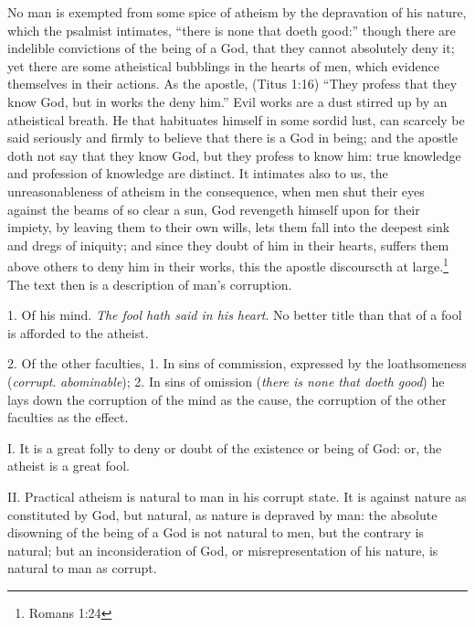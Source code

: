 \documentclass[a5paper]{book}
\begin{document}
No man is exempted from some spice of atheism by the depravation of his nature,
    which the psalmist intimates, 
    ``there is none that doeth good:''
    though there are indelible convictions of the being of a God,
    that they cannot absolutely deny it; 
    yet there are some atheistical bubblings in the hearts of men, 
    which evidence themselves in their actions. 
As the apostle, (Titus 1:16) ``They profess that they know God, 
    but in works the deny him.'' 
Evil works are a dust stirred up by an atheistical breath. 
He that habituates himself in some sordid lust, 
    can scarcely be said seriously and firmly to believe 
    that there is a God in being; 
    and the apostle doth not say that they know God, 
    but they profess to know him: 
    true knowledge and profession of knowledge are distinct.
It intimates also to us, 
    the unreasonableness of atheism in the consequence, 
    when men shut their eyes against the beams of so clear a sun,
    God revengeth himself upon for their impiety, 
    by leaving them to their own wills, 
    lets them fall into the deepest sink and dregs of iniquity; 
    and since they doubt of him in their hearts, 
    suffers them above others to deny him in their works, 
    this the apostle discourscth at large.\footnote{Romans 1:24}
The text then is a description of man’s corruption.

1. Of his mind. \emph{The fool hath said in his heart}. 
    No better title than that of a fool is afforded to the atheist.

2. Of the other faculties, 
    1. In sins of commission, expressed by the loathsomeness
    (\emph{corrupt}. \emph{abominable}); 
    2. In sins of omission (\emph{there is none that doeth good})
    he lays down the corruption of the mind as the cause,
    the corruption of the other faculties as the effect.

I. It is a great folly to deny or doubt of the existence or being of God:
    or, the atheist is a great fool.

II. Practical atheism is natural to man in his corrupt state. 
It is against nature as constituted by God, but natural, 
    as nature is depraved by man: 
    the absolute disowning of the being of a God is not natural to men, 
    but the contrary is natural; 
    but an inconsideration of God, or misrepresentation of his nature, 
    is natural to man as corrupt.
\end{document}
